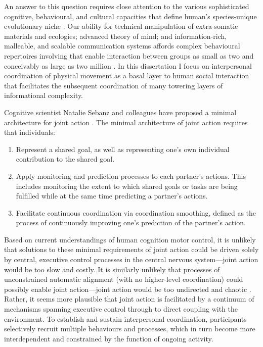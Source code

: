 \begin{CJK}{UTF8}{gbsn}
An answer to this question requires close attention to the various sophisticated cognitive, behavioural, and cultural capacities that define human's species-unique evolutionary niche \citep{Roepstorff2010,Clark2015,Fuentes2016}. Our ability for technical manipulation of extra-somatic materials and ecologies; advanced theory of mind; and information-rich, malleable, and scalable communication systems affords complex behavioural repertoires involving that enable interaction between groups as small as two and conceivably as large as two million \citep{Pacherie2012,Nowak2017}.  In this dissertation I focus on interpersonal coordination of physical movement as a basal layer to human social interaction that facilitates the subsequent coordination of many towering layers of informational complexity.

Cognitive scientist Natalie Sebanz and colleagues have proposed a minimal architecture for joint action \citep{Sebanz2006,Vesper2010}. The minimal architecture of joint action requires that individuals:

\begin{enumerate}
  \item Represent a shared goal, as well as representing one’s own individual contribution to the shared goal.
  \item Apply monitoring and prediction processes to each partner’s actions. This includes monitoring the extent to which shared goals or tasks are being fulfilled while at the same time predicting a partner’s actions.
  \item Facilitate continuous coordination via coordination smoothing, defined as the process of continuously improving one’s prediction of the partner’s action.
\end{enumerate}

Based on current understandings of human cognition motor control, it is unlikely that solutions to these minimal requirements of joint action could be driven solely by central, executive control processes in the central nervous system---joint action would be too slow and costly.  It is similarly unlikely that processes of unconstrained automatic alignment (with no higher-level coordination) could possibly enable joint action---joint action would be too undirected and chaotic \citep{Fusaroli2014}.  Rather, it seems more plausible that joint action is facilitated by a continuum of mechanisms spanning executive control through to direct coupling with the environment.  To establish and sustain interpersonal coordination, participants selectively recruit multiple behaviours and processes, which in turn become more interdependent and constrained by the function of ongoing activity.


\end{CJK}
